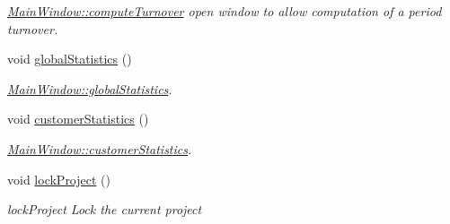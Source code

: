 \begin{DoxyCompactItemize}
\begin{DoxyCompactList}\small\item\em \hyperlink{classGui_1_1MainWindow_aa4cfc2b980835fe1ccd5b869a237c05f}{Main\-Window\-::compute\-Turnover} open window to allow computation of a period turnover. \end{DoxyCompactList}\item 
\hypertarget{classGui_1_1MainWindow_a41e44415a270150b6630efcb87768d7f}{void \hyperlink{classGui_1_1MainWindow_a41e44415a270150b6630efcb87768d7f}{global\-Statistics} ()}\label{classGui_1_1MainWindow_a41e44415a270150b6630efcb87768d7f}

\begin{DoxyCompactList}\small\item\em \hyperlink{classGui_1_1MainWindow_a41e44415a270150b6630efcb87768d7f}{Main\-Window\-::global\-Statistics}. \end{DoxyCompactList}\item 
\hypertarget{classGui_1_1MainWindow_a078b2546e65d2b91d3b2b546db619adb}{void \hyperlink{classGui_1_1MainWindow_a078b2546e65d2b91d3b2b546db619adb}{customer\-Statistics} ()}\label{classGui_1_1MainWindow_a078b2546e65d2b91d3b2b546db619adb}

\begin{DoxyCompactList}\small\item\em \hyperlink{classGui_1_1MainWindow_a078b2546e65d2b91d3b2b546db619adb}{Main\-Window\-::customer\-Statistics}. \end{DoxyCompactList}\item 
\hypertarget{classGui_1_1MainWindow_a96335036187601e48bb46945d57fc2a5}{void \hyperlink{classGui_1_1MainWindow_a96335036187601e48bb46945d57fc2a5}{lock\-Project} ()}\label{classGui_1_1MainWindow_a96335036187601e48bb46945d57fc2a5}

\begin{DoxyCompactList}\small\item\em lock\-Project Lock the current project \end{DoxyCompactList}\end{DoxyCompactItemize}
